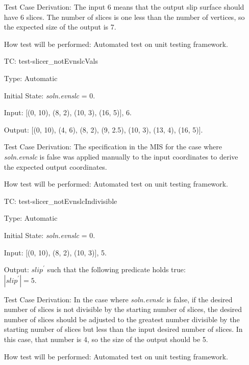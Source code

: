 \documentclass[12pt, titlepage]{article}
\newcounter{utestnum} %
\begin{document}
\begin{enumerate}[label=TC\arabic*:,ref={\arabic*}]
	Test Case Derivation: The input 6 means that the output slip surface should 
	have 6 slices. The number of slices is one less than the number of 
	vertices, so the expected size of the output is 7.
	
	How test will be performed: Automated test on unit testing framework.
	
	\item [TC\refstepcounter{utestnum}\theutestnum: 
	\label{TC_SlicerNotEvnslcVals}] 
	test-slicer\_notEvnslcVals
	
	Type: Automatic
	
	Initial State: \textit{soln.evnslc} = 0.
	
	Input: [(0, 10), (8, 2), (10, 3), (16, 5)], 6.
	
	Output: [(0, 10), (4, 6), (8, 2), (9, 2.5), (10, 3), (13, 4), (16, 5)].
	
	Test Case Derivation: The specification in the MIS for the case where 
	\textit{soln.evnslc} is false was applied manually to the input coordinates 
	to derive the expected output coordinates.
	
	How test will be performed: Automated test on unit testing framework.
	
	\item [TC\refstepcounter{utestnum}\theutestnum: 
	\label{TC_SlicerNotEvnslcIndivisible}] 
	test-slicer\_notEvnslcIndivisible
	
	Type: Automatic
	
	Initial State: \textit{soln.evnslc} = 0.
	
	Input: [(0, 10), (8, 2), (10, 3)], 5.
	
	Output: $\textit{slip}^\prime$ such that the following predicate holds 
	true:\\ 
	$|\textit{slip}^\prime| = 5$.
	
	Test Case Derivation: In the case where \textit{soln.evnslc} is false, if 
	the desired number of slices is not divisible by the starting number of 
	slices, the desired number of slices should be adjusted to the greatest 
	number divisible by the starting number of slices but less than the input 
	desired number of slices. In this case, that number is 4, so the size of 
	the output should be 5.
	
	How test will be performed: Automated test on unit testing framework.
	
\end{enumerate}
\end{document}
